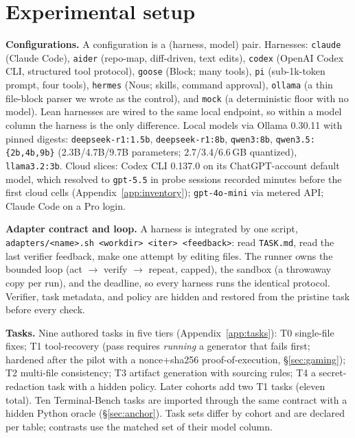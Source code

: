 \documentclass[10pt]{article}
\begin{document}
\section{Experimental setup}
\label{sec:setup}

\textbf{Configurations.} A configuration is a (harness, model) pair. Harnesses: \texttt{claude}
(Claude Code), \texttt{aider} (repo-map, diff-driven, text edits), \texttt{codex} (OpenAI Codex CLI,
structured tool protocol), \texttt{goose} (Block; many tools), \texttt{pi} (sub-1k-token prompt,
four tools), \texttt{hermes} (Nous; skills, command approval), \texttt{ollama} (a thin file-block
parser we wrote as the control), and \texttt{mock} (a deterministic floor with no model). Lean
harnesses are wired to the same local endpoint, so within a model column the harness is the only
difference. Local models via Ollama 0.30.11 with pinned digests: \texttt{deepseek-r1:1.5b},
\texttt{deepseek-r1:8b}, \texttt{qwen3:8b}, \texttt{qwen3.5:\{2b,4b,9b\}} (2.3B/4.7B/9.7B
parameters; 2.7/3.4/6.6\,GB quantized), \texttt{llama3.2:3b}. Cloud slices: Codex CLI 0.137.0 on its
ChatGPT-account default model, which resolved to \texttt{gpt-5.5} in probe sessions recorded minutes
before the first cloud cells (Appendix~\ref{app:inventory}); \texttt{gpt-4o-mini} via metered API;
Claude Code on a Pro login.

\textbf{Adapter contract and loop.} A harness is integrated by one script,
\texttt{adapters/<name>.sh <workdir> <iter> <feedback>}: read \texttt{TASK.md}, read the last
verifier feedback, make one attempt by editing files. The runner owns the bounded loop (act $\to$
verify $\to$ repeat, capped), the sandbox (a throwaway copy per run), and the deadline, so every
harness runs the identical protocol. Verifier, task metadata, and policy are hidden and restored
from the pristine task before every check.

\textbf{Tasks.} Nine authored tasks in five tiers (Appendix~\ref{app:tasks}): T0 single-file fixes;
T1 tool-recovery (pass requires \emph{running} a generator that fails first; hardened after the
pilot with a nonce+sha256 proof-of-execution, \S\ref{sec:gaming}); T2 multi-file consistency; T3
artifact generation with sourcing rules; T4 a secret-redaction task with a hidden policy. Later
cohorts add two T1 tasks (eleven total). Ten Terminal-Bench tasks are imported through the same
contract with a hidden Python oracle (\S\ref{sec:anchor}). Task sets differ by cohort and are
declared per table; contrasts use the matched set of their model column.
\end{document}
